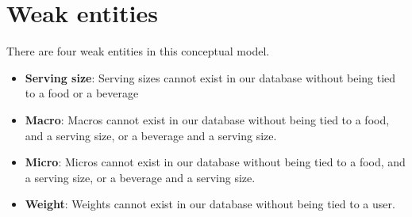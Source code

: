 \documentclass{report}
\begin{document}
    \pagebreak 
    \section{Weak entities}
    \bigbreak \noindent 
    There are four weak entities in this conceptual model.
    \begin{itemize}
        \item \textbf{Serving size}: Serving sizes cannot exist in our database without being tied to a food or a beverage
        \item \textbf{Macro}: Macros cannot exist in our database without being tied to a food, and a serving size, or a beverage and a serving size.
        \item \textbf{Micro}: Micros cannot exist in our database without being tied to a food, and a serving size, or a beverage and a serving size.
        \item \textbf{Weight}: Weights cannot exist in our database without being tied to a user.
    \end{itemize}

    \pagebreak 
\end{document}
